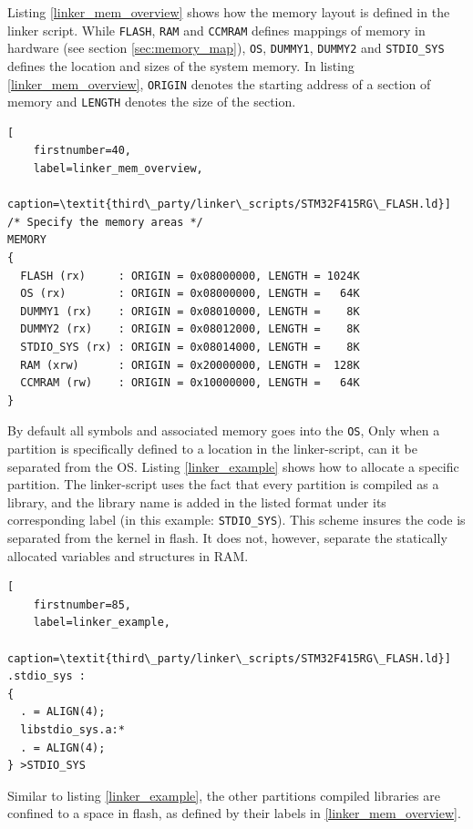 Listing \ref{linker_mem_overview} shows how the memory layout is defined in the linker script.
While \texttt{FLASH}, \texttt{RAM} and \texttt{CCMRAM} defines mappings of memory in hardware (see section \ref{sec:memory_map}),
\texttt{OS}, \texttt{DUMMY1}, \texttt{DUMMY2} and \texttt{STDIO\_SYS} defines the location and sizes of the system memory.
In listing \ref{linker_mem_overview}, \texttt{ORIGIN} denotes the starting address of a section of memory
and \texttt{LENGTH} denotes the size of the section.\\

\begin{minipage}{\linewidth}
\begin{lstlisting}[
	firstnumber=40,
	label=linker_mem_overview,
	caption=\textit{third\_party/linker\_scripts/STM32F415RG\_FLASH.ld}]
/* Specify the memory areas */
MEMORY
{
  FLASH (rx)     : ORIGIN = 0x08000000, LENGTH = 1024K
  OS (rx)        : ORIGIN = 0x08000000, LENGTH =   64K
  DUMMY1 (rx)    : ORIGIN = 0x08010000, LENGTH =    8K
  DUMMY2 (rx)    : ORIGIN = 0x08012000, LENGTH =    8K
  STDIO_SYS (rx) : ORIGIN = 0x08014000, LENGTH =    8K
  RAM (xrw)      : ORIGIN = 0x20000000, LENGTH =  128K
  CCMRAM (rw)    : ORIGIN = 0x10000000, LENGTH =   64K
}
\end{lstlisting}
\end{minipage}

By default all symbols and associated memory goes into the \texttt{OS},
Only when a partition is specifically defined to a location in the linker-script,
can it be separated from the OS.
Listing \ref{linker_example} shows how to allocate a specific partition.
The linker-script uses the fact that every partition is compiled as a library,
and the library name is added in the listed format under its corresponding label
(in this example: \texttt{STDIO\_SYS}).
This scheme insures the code is separated from the kernel in flash.
It does not, however, separate the statically allocated variables and structures in RAM.\\

\begin{minipage}{\linewidth}
\begin{lstlisting}[
	firstnumber=85,
	label=linker_example,
	caption=\textit{third\_party/linker\_scripts/STM32F415RG\_FLASH.ld}]
.stdio_sys :
{
  . = ALIGN(4);
  libstdio_sys.a:*
  . = ALIGN(4);
} >STDIO_SYS
\end{lstlisting}
\end{minipage}

Similar to listing \ref{linker_example},
the other partitions compiled libraries are confined to a space in flash,
as defined by their labels in \ref{linker_mem_overview}.

